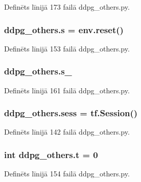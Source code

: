 Definēts līnijā 173 failā ddpg\+\_\+others.\+py.

\subsubsection[{\texorpdfstring{s}{s}}]{\setlength{\rightskip}{0pt plus 5cm}ddpg\+\_\+others.\+s = env.\+reset()}\hypertarget{namespaceddpg__others_a2e657d9112433f7acfe9a28c8e7ce79a}{}\label{namespaceddpg__others_a2e657d9112433f7acfe9a28c8e7ce79a}


Definēts līnijā 153 failā ddpg\+\_\+others.\+py.

\subsubsection[{\texorpdfstring{s\+\_\+}{s_}}]{\setlength{\rightskip}{0pt plus 5cm}ddpg\+\_\+others.\+s\+\_\+}\hypertarget{namespaceddpg__others_a9401d5decfd243fdd11c64d512501ff1}{}\label{namespaceddpg__others_a9401d5decfd243fdd11c64d512501ff1}


Definēts līnijā 161 failā ddpg\+\_\+others.\+py.

\subsubsection[{\texorpdfstring{sess}{sess}}]{\setlength{\rightskip}{0pt plus 5cm}ddpg\+\_\+others.\+sess = tf.\+Session()}\hypertarget{namespaceddpg__others_a88947f5e132c9538f8d4ce16004711ca}{}\label{namespaceddpg__others_a88947f5e132c9538f8d4ce16004711ca}


Definēts līnijā 142 failā ddpg\+\_\+others.\+py.

\subsubsection[{\texorpdfstring{t}{t}}]{\setlength{\rightskip}{0pt plus 5cm}int ddpg\+\_\+others.\+t = 0}\hypertarget{namespaceddpg__others_aee1bec6a64f3215b28552758ee87bfc6}{}\label{namespaceddpg__others_aee1bec6a64f3215b28552758ee87bfc6}


Definēts līnijā 154 failā ddpg\+\_\+others.\+py.

